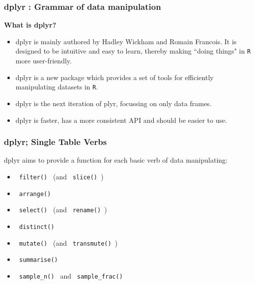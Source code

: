 \documentclass[MASTER.tex]{subfiles}
\begin{document}
 
		\begin{frame}[fragile]
		\frametitle{dplyr : Grammar of data manipulation}
		\Large
		\textbf{What is dplyr?}
		\begin{itemize}
			\item dplyr is mainly authored by Hadley Wickham and Romain Francois. It is designed to be intuitive and easy to learn, thereby making ``doing things" in \texttt{R} more user-friendly.
			\item dplyr is a new package which provides a set of tools for efficiently manipulating datasets in \texttt{R}.
			\item dplyr is the next iteration of plyr, focussing on only data frames. \item dplyr is faster, has a more consistent API and should be easier to use. 
		\end{itemize}
	\end{frame}
	\begin{frame}
		\frametitle{dplyr; Single Table Verbs}
		\Large
		dplyr aims to provide a function for each basic verb of data manipulating:
		\begin{itemize}
			\item \texttt{ filter() } (and \texttt{  slice() })
			\item \texttt{ arrange() }
			\item \texttt{ select() } (and \texttt{  rename() })
			\item \texttt{ distinct() }
			\item \texttt{ mutate() } (and \texttt{  transmute() })
			\item \texttt{ summarise() }
			\item \texttt{ sample\_n() } and \texttt{  sample\_frac() }
		\end{itemize}
	\end{frame}
	
\end{document}
